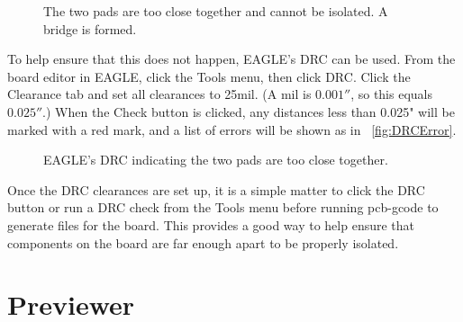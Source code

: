 \documentclass[11pt]{book}
\begin{document}
\begin{figure}
	\caption{The two pads are too close together and cannot be isolated. A bridge is formed.}
	\label{fig:TooClose}
\end{figure}

To help ensure that this does not happen, EAGLE's DRC can be used. From the board editor in EAGLE, click the Tools menu, then click DRC. Click the Clearance tab and set all clearances to 25mil. (A mil is $0.001''$, so this equals $0.025''$.) When the Check button is clicked, any distances less than 0.025" will be marked with a red mark, and a list of errors will be shown as in \figurename~\vref{fig:DRCError}.

\begin{figure}
	\caption{EAGLE's DRC indicating the two pads are too close together.}
	\label{fig:DRCError}
\end{figure}

Once the DRC clearances are set up, it is a simple matter to click the DRC button or run a DRC check from the Tools menu before running pcb-gcode to generate files for the board. This provides a good way to help ensure that components on the board are far enough apart to be properly isolated.

%
%
\section{Previewer}\label{sec:Previewer}
\end{document}

